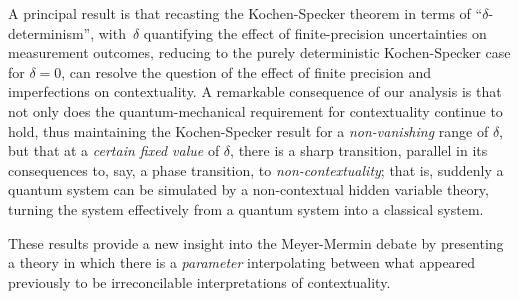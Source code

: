 \documentclass[english,reprint, aps, prl,superscriptaddress, showpacs,
showkeys, longbibliography, amsmath, amssymb, floatfix]{revtex4-1}
\theoremstyle{plain}
\theoremstyle{definition}
\newcommand{\yutsung}[1]{\begin{framed}\begin{minipage}{0.9\linewidth}\color{purple}{Yu-Tsung says: #1}\end{minipage}\end{framed}}
\begin{document}
A principal result is that recasting the Kochen-Specker theorem in
terms of ``$\delta$-determinism'', with~$\delta$ quantifying the
effect of finite-precision uncertainties on measurement outcomes,
reducing to the purely deterministic Kochen-Specker case for
$\delta=0$, can resolve the question of the effect of finite precision
and imperfections on contextuality.  A remarkable consequence of our
analysis is that not only does the quantum-mechanical requirement for
contextuality continue to hold, thus maintaining the Kochen-Specker
result for a \emph{non-vanishing} range of $\delta$, but that at a
\emph{certain fixed value} of $\delta$, there is a sharp transition,
parallel in its consequences to, say, a phase transition, to
\emph{non-contextuality}; that is, suddenly a quantum system can be
simulated by a non-contextual hidden variable theory, turning the
system effectively from a quantum system into a classical system. 
\yutsung{Still not comfortable about the current statement...}
These results provide a new insight into the Meyer-Mermin debate by
presenting a theory in which there is a \emph{parameter} interpolating
between what appeared previously to be irreconcilable interpretations
of contextuality.
\end{document}
